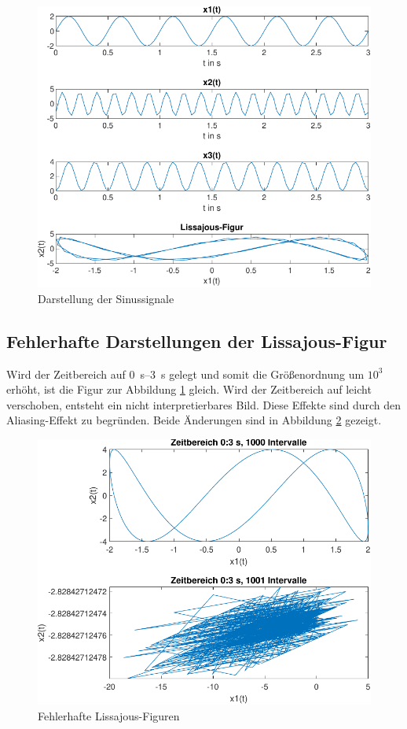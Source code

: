 \documentclass[
    paper=a4,
    fontsize=10pt,
    DIV=13,
    oneside,
]{scrartcl}
\begin{document}
    \begin{figure}[hbt]
        \centering
        \includegraphics[width=\imagewidth]{../versuch1/sinus.pdf}
        \caption{Darstellung der Sinussignale}
        \label{fig:sinus}
    \end{figure}

    \subsection{Fehlerhafte Darstellungen der Lissajous-Figur}
        Wird der Zeitbereich auf \SIrange{0}{3}{\second} gelegt und somit die Größenordnung um \(10^3\) erhöht, ist die Figur zur Abbildung \ref{fig:sinus} gleich. Wird der Zeitbereich auf leicht verschoben, entsteht ein nicht interpretierbares Bild. Diese Effekte sind durch den Aliasing-Effekt zu begründen.
        Beide Änderungen sind in Abbildung \ref{fig:lissajous} gezeigt.

        \begin{figure}[hbt]
            \centering
            \includegraphics[width=\imagewidth]{../versuch1/lissjaou.pdf}
            \caption{Fehlerhafte Lissajous-Figuren}
            \label{fig:lissajous}
        \end{figure}
\end{document}
